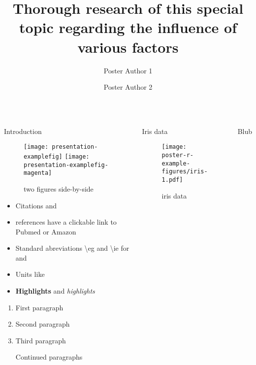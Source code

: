 \documentclass[english,xcolor=table,t
]{beamer}
\title{Thorough research of this special topic regarding the influence of
various factors}
\author{Poster Author 1 \and Poster Author 2}
\institute{Institute, Dept., University}
\begin{document}
\begin{frame}

\begin{columns}


\begin{block}{Introduction}


\begin{figure}
\texttt{[image: presentation-examplefig]}
\texttt{[image: presentation-examplefig-magenta]}
\caption{two figures side-by-side}
\end{figure}


\begin{itemize}
\itemsep1pt\parskip0pt
\item
  Citations \autocite{Macherey2006} and \textcite{Macherey2006}
\item
  references have a clickable link to Pubmed or Amazon
\item
  Standard abreviations \textbackslash{}eg and \textbackslash{}ie for
  \eg and \ie
\item
  Units like 
\item
  \textbf{Highlights} and \emph{highlights}
\end{itemize}


\begin{enumerate}
\def\labelenumi{\arabic{enumi}.}
\item
  First paragraph
\item
  Second paragraph
\item
  Third paragraph

  Continued paragraphs
\end{enumerate}

\end{block}

\begin{block}{Iris data}

\begin{figure}
\texttt{[image: poster-r-example-figures/iris-1.pdf]}
\caption{iris data}
\end{figure}

\end{block}

\begin{block}{Blub}


\end{block}
\end{columns}
\end{frame}
\end{document}

